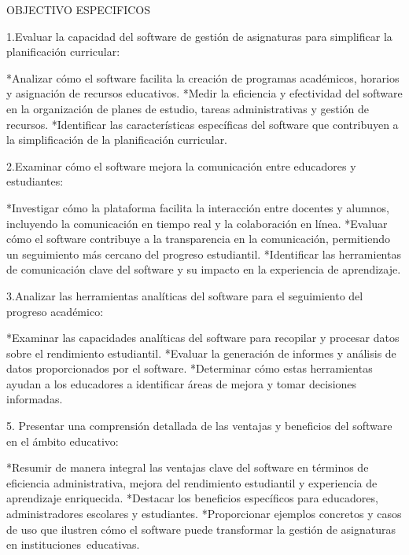 OBJECTIVO ESPECIFICOS 

1.Evaluar la capacidad del software de gestión de asignaturas para simplificar la planificación curricular:

*Analizar cómo el software facilita la creación de programas académicos, horarios y asignación de recursos educativos.
*Medir la eficiencia y efectividad del software en la organización de planes de estudio, tareas administrativas y gestión de recursos.
*Identificar las características específicas del software que contribuyen a la simplificación de la planificación curricular.

2.Examinar cómo el software mejora la comunicación entre educadores y estudiantes:

*Investigar cómo la plataforma facilita la interacción entre docentes y alumnos, incluyendo la comunicación en tiempo real y la colaboración en línea.
*Evaluar cómo el software contribuye a la transparencia en la comunicación, permitiendo un seguimiento más cercano del progreso estudiantil.
*Identificar las herramientas de comunicación clave del software y su impacto en la experiencia de aprendizaje.

3.Analizar las herramientas analíticas del software para el seguimiento del progreso académico:

*Examinar las capacidades analíticas del software para recopilar y procesar datos sobre el rendimiento estudiantil.
*Evaluar la generación de informes y análisis de datos proporcionados por el software.
*Determinar cómo estas herramientas ayudan a los educadores a identificar áreas de mejora y tomar decisiones informadas.

5. Presentar una comprensión detallada de las ventajas y beneficios del software en el ámbito educativo:

*Resumir de manera integral las ventajas clave del software en términos de eficiencia administrativa, mejora del rendimiento estudiantil
y experiencia de aprendizaje enriquecida.
*Destacar los beneficios específicos para educadores, administradores escolares y estudiantes.
*Proporcionar ejemplos concretos y casos de uso que ilustren cómo el software puede transformar la gestión de asignaturas en
instituciones educativas.

